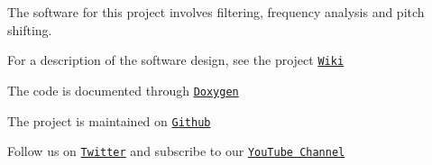 The software for this project involves filtering, frequency analysis and pitch shifting.

For a description of the software design, see the project \href{https://github.com/a2198699s/pitch-perfector/wiki/Software-Design}{\tt Wiki}

The code is documented through \href{https://a2198699s.github.io/pitch-perfector/html/index.html}{\tt Doxygen}

The project is maintained on \href{https://github.com/a2198699s/pitch-perfector}{\tt Github}

Follow us on \href{https://twitter.com/PerfectorPitch}{\tt Twitter} and subscribe to our \href{https://www.youtube.com/channel/UCyVIknnXCnTIX-vixUphqTg}{\tt You\-Tube Channel} 